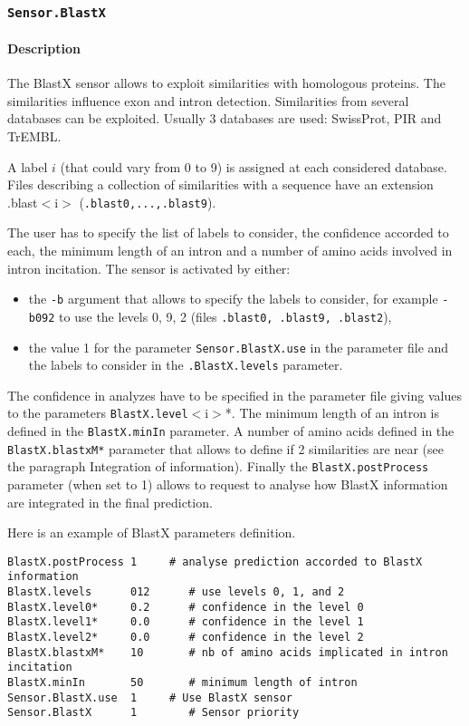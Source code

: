 
\subsubsection{\texttt{Sensor.BlastX}}

\paragraph{Description}

The BlastX sensor allows to exploit similarities with homologous
proteins. The similarities influence exon and intron detection.
Similarities from several databases can be exploited. Usually 3
databases are used: SwissProt, PIR and TrEMBL.

A label $i$ (that could vary from 0 to 9) is assigned at each
considered database. Files describing a collection of similarities with
a sequence have an extension .blast$<$i$>$ (\texttt{.blast0,...,.blast9}).

The user has to specify the list of labels to consider, the
confidence accorded to each, the minimum length of an intron and a
number of amino acids involved in intron incitation.  The sensor is
activated by either:
\begin{itemize}
\item the \texttt{-b} argument 
  that allows to specify the labels to consider, for example
  \texttt{-b092} to use the levels 0, 9, 2 (files \texttt{.blast0,
    .blast9, .blast2}),
\item the value 1 for the parameter \texttt{Sensor.BlastX.use} in
  the parameter file and the labels to consider in the
  \texttt{.BlastX.levels} parameter.
\end{itemize}
The confidence in analyzes have to be specified in the parameter file
giving values to the parameters \texttt{BlastX.level}$<$i$>$*.  The
minimum length of an intron is defined in the \texttt{BlastX.minIn}
parameter.  A number of amino acids defined in the
\texttt{BlastX.blastxM*} parameter that allows to define if 2
similarities are near (see the paragraph Integration of information).
Finally the \texttt{BlastX.postProcess} parameter (when set to 1)
allows to request to analyse how BlastX information are integrated in
the final prediction.

Here is an example of BlastX parameters definition.
\begin{Verbatim}[fontsize=\small]
BlastX.postProcess 1     # analyse prediction accorded to BlastX information
BlastX.levels      012      # use levels 0, 1, and 2
BlastX.level0*     0.2      # confidence in the level 0
BlastX.level1*     0.0      # confidence in the level 1
BlastX.level2*     0.0      # confidence in the level 2
BlastX.blastxM*    10       # nb of amino acids implicated in intron incitation
BlastX.minIn       50       # minimum length of intron
Sensor.BlastX.use  1     # Use BlastX sensor
Sensor.BlastX      1        # Sensor priority
\end{Verbatim}

